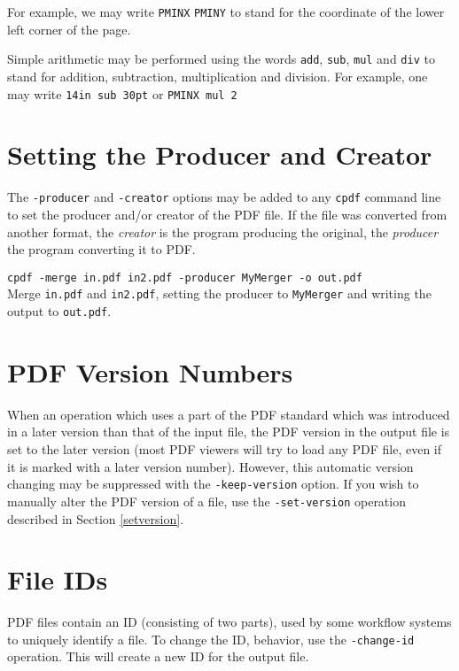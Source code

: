 \documentclass{book}
\begin{document}
\noindent For example, we may write \texttt{PMINX} \texttt{PMINY} to stand for the coordinate of the lower left corner of the page.

Simple arithmetic may be performed using the words \texttt{add}, \texttt{sub}, \texttt{mul} and \texttt{div} to stand for addition, subtraction, multiplication and division. For example, one may write \texttt{14in\hspace{-1mm} sub\hspace{-1mm} 30pt} or \texttt{PMINX\hspace{-1mm} mul\hspace{-1mm} 2}

\section{Setting the Producer and Creator}
The \texttt{-producer} and \texttt{-creator} options may be added to any \texttt{cpdf} command line to set the producer and/or creator of the PDF file. If the file was converted from another format, the \textit{creator} is the program producing the original, the \textit{producer} the program converting it to PDF.

\begin{framed}
  \small\verb!cpdf -merge in.pdf in2.pdf -producer MyMerger -o out.pdf!\\

  \vspace{2.5mm}
  \noindent Merge \texttt{in.pdf} and \texttt{in2.pdf}, setting the producer to \texttt{MyMerger} and writing the output to \texttt{out.pdf}.\end{framed}

\section{PDF Version Numbers}
When an operation which uses a part of the PDF standard which was introduced in
a later version than that of the input file, the PDF version in the output file
is set to the later version (most PDF viewers will try to load any PDF file,
even if it is marked with a later version number). However, this automatic
version changing may be suppressed with the \texttt{-keep-version} option. If you wish to manually alter the PDF version of a file, use the
\texttt{-set-version} operation described in Section \ref{setversion}.

\section{File IDs}
PDF files contain an ID (consisting of two parts), used by some workflow
systems to uniquely identify a file. To change the ID, behavior, use the
\texttt{-change-id} operation. This will create a new ID for the output file. 
\end{document}
